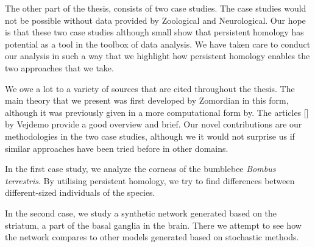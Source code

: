 The other part of the thesis, consists of two case studies. The case studies would not be possible without data provided by Zoological and Neurological. Our hope is that these two case studies although small show that persistent homology has potential as a tool in the toolbox of data analysis. We have taken care to conduct our analysis in such a way that we highlight how persistent homology enables the two approaches that we take.

We owe a lot to a variety of sources that are cited throughout the thesis. The main theory that we present was first developed by Zomordian in this form, although it was previously given in a more computational form by. The articles [] by Vejdemo provide a good overview and brief. Our novel contributions are our methodologies in the two case studies, although we it would not surprise us if similar approaches have been tried before in other domains.

 In the first case study, we analyze the corneas of the bumblebee \textit{Bombus terrestris}. By utilising persistent homology, we try to find differences between different-sized individuals of the species.

In the second case, we study a synthetic network generated based on the striatum, a part of the basal ganglia in the brain. There we attempt to see how the network compares to other models generated based on stochastic methods.



